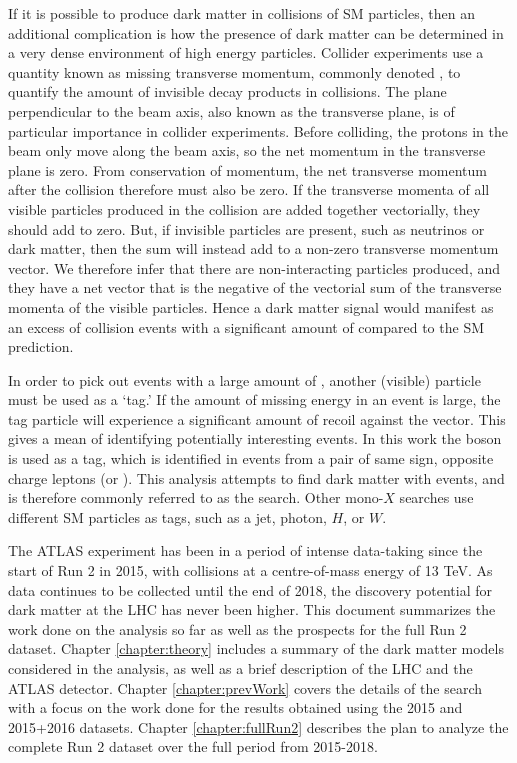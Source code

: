 If it is possible to produce dark matter in collisions of SM particles, then an additional complication is how the presence of dark matter can be determined in a very dense environment of high energy particles. Collider experiments use a quantity known as missing transverse momentum, commonly denoted \etmiss, to quantify the amount of invisible decay products in collisions. The plane perpendicular to the beam axis, also known as the transverse plane, is of particular importance in collider experiments. Before colliding, the protons in the beam only move along the beam axis, so the net momentum in the transverse plane is zero. From conservation of momentum, the net transverse momentum after the collision therefore must also be zero. If the transverse momenta of all visible particles produced in the collision are added together vectorially, they should add to zero. But, if invisible particles are present, such as neutrinos or dark matter, then the sum will instead add to a non-zero transverse momentum vector. We therefore infer that there are non-interacting particles produced, and they have a net \etmiss vector that is the negative of the vectorial sum of the transverse momenta of the visible particles. Hence a dark matter signal would manifest as an excess of collision events with a significant amount of \etmiss compared to the SM prediction.

In order to pick out events with a large amount of \etmiss, another (visible) particle must be used as a `tag.' If the amount of missing energy in an event is large, the tag particle will experience a significant amount of recoil against the \etmiss vector. This gives a mean of identifying potentially interesting events. In this work the \Z boson is used as a tag, which is identified in events from a pair of same sign, opposite charge leptons (\epem or \mpmm). This analysis attempts to find dark matter with \Zlletmiss events, and is therefore commonly referred to as the \monoZll search. Other mono-$X$ searches use different SM particles as tags, such as a jet, photon, $H$, or $W$.

The ATLAS experiment has been in a period of intense data-taking since the start of Run 2 in 2015, with \pp collisions at a centre-of-mass energy of 13 TeV. As data continues to be collected until the end of 2018, the discovery potential for dark matter at the LHC has never been higher. This document summarizes the work done on the \monoZll analysis so far as well as the prospects for the full Run 2 dataset. Chapter \ref{chapter:theory} includes a summary of the dark matter models considered in the analysis, as well as a brief description of the LHC and the ATLAS detector. Chapter \ref{chapter:prevWork} covers the details of the search with a focus on the work done for the results obtained using the 2015 and 2015+2016 datasets. Chapter \ref{chapter:fullRun2} describes the plan to analyze the complete Run 2 dataset over the full period from 2015-2018.



